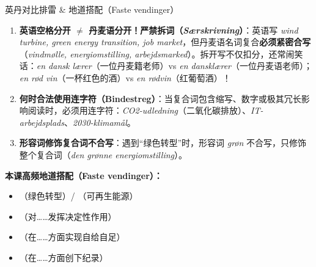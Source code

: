 \begin{grammatikbox}{英丹对比排雷 \& 地道搭配（Faste vendinger）}
\begin{enumerate}
  \item \textbf{英语空格分开 $\neq$ 丹麦语分开！严禁拆词（\textit{Særskrivning}）}：英语写 \textit{wind turbine, green energy transition, job market}，但丹麦语名词复合\textbf{必须紧密合写}（\textit{vindmølle, energiomstilling, arbejdsmarked}）。拆开写不仅扣分，还常闹笑话：\textit{en dansk lærer}（一位丹麦籍老师）vs \textit{en dansklærer}（一位丹麦语老师）；\textit{en rød vin}（一杯红色的酒）vs \textit{en rødvin}（红葡萄酒）！
  \item \textbf{何时合法使用连字符（Bindestreg）}：当复合词包含缩写、数字或极其冗长影响阅读时，必须用连字符：\textit{CO2-udledning}（二氧化碳排放）、\textit{IT-arbejdsplads}、\textit{2030-klimamål}。
  \item \textbf{形容词修饰复合词不合写}：遇到“绿色转型”时，形容词 \textit{grøn} 不合写，只修饰整个复合词（\textit{den grønne energiomstilling}）。
\end{enumerate}

\textbf{本课高频地道搭配（Faste vendinger）：}
\begin{itemize}
  \item {}（绿色转型）/ （可再生能源）
  \item {}（对……发挥决定性作用）
  \item {}（在……方面实现自给自足）
  \item {}（在……方面创下纪录）
\end{itemize}
\end{grammatikbox}


